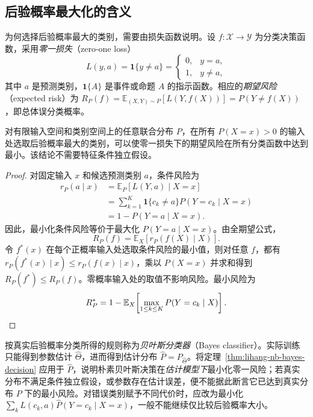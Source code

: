 \subsection{后验概率最大化的含义}
\label{subsec:lihang-nb-posterior-risk}

为何选择后验概率最大的类别，需要由损失函数说明。设 $f:\mathcal{X}\to\mathcal{Y}$ 为分类决策函数，采用\emph{零一损失}（zero-one loss）
\[
    L(y,a)=\mathbf{1}\{y\neq a\}
    =\begin{cases}0,&y=a,\\1,&y\neq a,\end{cases}
\]
其中 $a$ 是预测类别，$\mathbf{1}\{A\}$ 是事件或命题 $A$ 的指示函数。相应的\emph{期望风险}（expected risk）为 $R_P(f)=\mathbb{E}_{(X,Y)\sim P}[L(Y,f(X))]=P(Y\neq f(X))$，即总体误分类概率。

\begin{theorem}
\label{thm:lihang-nb-bayes-decision}
对有限输入空间和类别空间上的任意联合分布 $P$，在所有 $P(X=x)>0$ 的输入处选取后验概率最大的类别，可以使零一损失下的期望风险在所有分类函数中达到最小。该结论不需要特征条件独立假设。
\end{theorem}

\begin{proof}
对固定输入 $x$ 和候选预测类别 $a$，条件风险为
\begin{align*}
    r_P(a\mid x)
    &=\mathbb{E}_P[L(Y,a)\mid X=x]\\
    &=\sum_{k=1}^{K}\mathbf{1}\{c_k\neq a\}P(Y=c_k\mid X=x)\\
    &=1-P(Y=a\mid X=x).
\end{align*}
因此，最小化条件风险等价于最大化 $P(Y=a\mid X=x)$。由全期望公式，
\[
    R_P(f)=\mathbb{E}_X[r_P(f(X)\mid X)].
\]
令 $f^*(x)$ 在每个正概率输入处选取条件风险的最小值，则对任意 $f$，都有 $r_P(f^*(x)\mid x)\leq r_P(f(x)\mid x)$，乘以 $P(X=x)$ 并求和得到 $R_P(f^*)\leq R_P(f)$。零概率输入处的取值不影响风险。最小风险为
\[
    R_P^*=1-\mathbb{E}_X\!\left[\max_{1\leq k\leq K}P(Y=c_k\mid X)\right].\qedhere
\]
\end{proof}

按真实后验概率分类所得的规则称为\emph{贝叶斯分类器}（Bayes classifier）。实际训练只能得到参数估计 $\widehat\Theta$，进而得到估计分布 $\widehat P=P_{\widehat\Theta}$。将定理~\ref{thm:lihang-nb-bayes-decision} 应用于 $\widehat P$，说明朴素贝叶斯决策在\emph{估计模型下}最小化零一风险；若真实分布不满足条件独立假设，或参数存在估计误差，便不能据此断言它已达到真实分布 $P$ 下的最小风险。对错误类别赋予不同代价时，应改为最小化 $\sum_k L(c_k,a)\widehat P(Y=c_k\mid X=x)$，一般不能继续仅比较后验概率大小。

